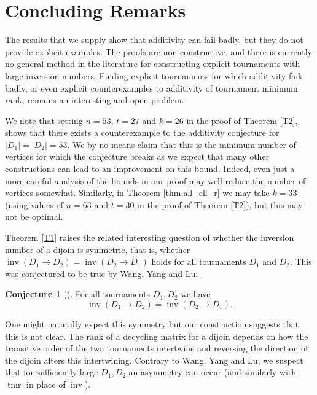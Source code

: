 \documentclass[10pt,a4paper]{amsart}
\numberwithin{equation}{section}
\theoremstyle{plain}
\theoremstyle{remark}
\theoremstyle{definition}
\newtheorem{conj}[thm]{Conjecture}
\newcommand{\tmr}{\operatorname{tmr}}
\newcommand{\inv}{\operatorname{inv}}
\begin{document}
 \section{Concluding Remarks}\label{sec:conclusion}

 The results that we supply show that additivity can fail badly, but they do not provide explicit examples. The proofs are non-constructive, and there is currently no general method in the literature for constructing explicit tournaments with large inversion numbers. Finding explicit tournaments for which additivity fails badly, or even explicit counterexamples to additivity of tournament minimum rank, remains an interesting and open problem.
 
 We note that setting $n = 53$, $t=27$ and $k =26$ in the proof of Theorem \ref{T2}, shows that there exists a counterexample to the additivity conjecture for $|D_1|=|D_2|=53$. We by no means claim that this is the minimum number of vertices for which the conjecture breaks as we expect that many other constructions can lead to an improvement on this bound. Indeed, even just a more careful analysis of the bounds in our proof may well reduce the number of vertices somewhat.
Similarly, in Theorem \ref{thm:all_ell_r} we may take $k = 33$ (using values of $n=63$ and $t=30$ in the proof of Theorem \ref{T2}), but this may not be optimal.

 \bigskip


 Theorem \ref{T1} raises the related interesting question of whether the inversion number of a dijoin is symmetric, that is, whether $\inv(D_1 \to D_2) = \inv(D_2 \to D_1)$ holds for all tournaments $D_1$ and $D_2$. This was conjectured to be true by Wang, Yang and Lu. 
 
   \begin{conj}[{\cite[Conjecture 1.11]{Wang}}]\label{conj}
    For all tournaments $D_1,D_2$ we have
     \begin{equation*}
         \inv(D_1 \to D_2) = \inv(D_2 \to D_1).
     \end{equation*}
 \end{conj}
 
 One might naturally expect this symmetry but our construction suggests that this is not clear. The rank of a decycling matrix for a dijoin depends on how the transitive order of the two tournaments intertwine and reversing the direction of the dijoin alters this intertwining.
 Contrary to Wang, Yang and Lu, we suspect that for sufficiently large  $D_1,D_2$ an asymmetry can occur 
 (and similarly with $\tmr$ in place of $\inv$).
 
\end{document}
